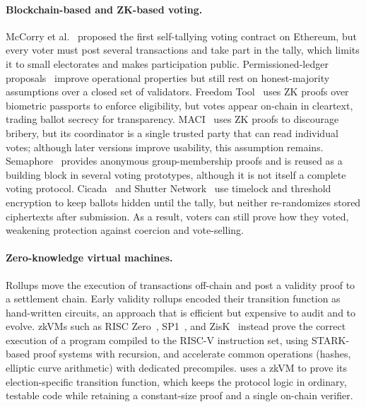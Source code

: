 \paragraph{Blockchain-based and ZK-based voting.}
McCorry et al.~\cite{mccorry2017} proposed the first self-tallying voting contract on Ethereum, but every voter must post several transactions and take part in the tally, which limits it to small electorates and makes participation public. Permissioned-ledger proposals~\cite{kirillov2019} improve operational properties but still rest on honest-majority assumptions over a closed set of validators.
Freedom Tool~\cite{freedomtool2024} uses ZK proofs over biometric passports to enforce eligibility, but votes appear on-chain in cleartext, trading ballot secrecy for transparency.
MACI~\cite{maci2019} uses ZK proofs to discourage bribery, but its coordinator is a single trusted party that can read individual votes; although later versions improve usability, this assumption remains.
Semaphore~\cite{semaphore2020} provides anonymous group-membership proofs and is reused as a building block in several voting prototypes, although it is not itself a complete voting protocol.
Cicada~\cite{cicada2023} and Shutter Network~\cite{shutter2024} use timelock and threshold encryption to keep ballots hidden until the tally, but neither re-randomizes stored ciphertexts after submission. As a result, voters can still prove how they voted, weakening protection against coercion and vote-selling.

\paragraph{Zero-knowledge virtual machines.}
Rollups move the execution of transactions off-chain and post a validity proof to a settlement chain. Early validity rollups encoded their transition function as hand-written circuits, an approach that is efficient but expensive to audit and to evolve. \acp{zkVM} such as RISC Zero~\cite{bruestle2023risczero}, SP1~\cite{sp1}, and ZisK~\cite{zisk} instead prove the correct execution of a program compiled to the RISC-V instruction set, using \ac{STARK}-based proof systems with recursion, and accelerate common operations (hashes, elliptic curve arithmetic) with dedicated precompiles. \Davinci uses a \ac{zkVM} to prove its election-specific transition function, which keeps the protocol logic in ordinary, testable code while retaining a constant-size proof and a single on-chain verifier.


